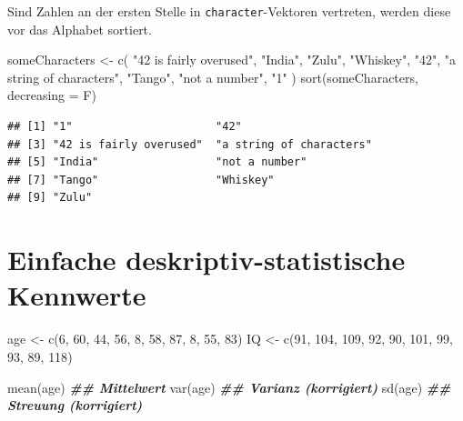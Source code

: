\documentclass[
]{book}
\newenvironment{Shaded}{\begin{snugshade}}{\end{snugshade}}
\newcommand{\AttributeTok}[1]{\textcolor[rgb]{0.77,0.63,0.00}{#1}}
\newcommand{\DecValTok}[1]{\textcolor[rgb]{0.00,0.00,0.81}{#1}}
\newcommand{\DocumentationTok}[1]{\textcolor[rgb]{0.56,0.35,0.01}{\textbf{\textit{#1}}}}
\newcommand{\FunctionTok}[1]{\textcolor[rgb]{0.00,0.00,0.00}{#1}}
\newcommand{\NormalTok}[1]{#1}
\newcommand{\OtherTok}[1]{\textcolor[rgb]{0.56,0.35,0.01}{#1}}
\newcommand{\StringTok}[1]{\textcolor[rgb]{0.31,0.60,0.02}{#1}}
\begin{document}
Sind Zahlen an der ersten Stelle in \texttt{character}-Vektoren vertreten, werden diese vor das Alphabet sortiert.

\begin{Shaded}
\begin{Highlighting}[]
\NormalTok{someCharacters }\OtherTok{\textless{}{-}} \FunctionTok{c}\NormalTok{(}
  \StringTok{"42 is fairly overused"}\NormalTok{,}
  \StringTok{"India"}\NormalTok{,}
  \StringTok{"Zulu"}\NormalTok{,}
  \StringTok{"Whiskey"}\NormalTok{,}
  \StringTok{"42"}\NormalTok{,}
  \StringTok{"a string of characters"}\NormalTok{,}
  \StringTok{"Tango"}\NormalTok{,}
  \StringTok{"not a number"}\NormalTok{,}
  \StringTok{"1"}
\NormalTok{)}
\FunctionTok{sort}\NormalTok{(someCharacters, }\AttributeTok{decreasing =}\NormalTok{ F)}
\end{Highlighting}
\end{Shaded}

\begin{verbatim}
## [1] "1"                      "42"                    
## [3] "42 is fairly overused"  "a string of characters"
## [5] "India"                  "not a number"          
## [7] "Tango"                  "Whiskey"               
## [9] "Zulu"
\end{verbatim}

\hypertarget{einfache-deskriptiv-statistische-kennwerte}{%
\section{Einfache deskriptiv-statistische Kennwerte}\label{einfache-deskriptiv-statistische-kennwerte}}

\begin{Shaded}
\begin{Highlighting}[]
\NormalTok{age }\OtherTok{\textless{}{-}} \FunctionTok{c}\NormalTok{(}\DecValTok{6}\NormalTok{, }\DecValTok{60}\NormalTok{, }\DecValTok{44}\NormalTok{, }\DecValTok{56}\NormalTok{, }\DecValTok{8}\NormalTok{, }\DecValTok{58}\NormalTok{, }\DecValTok{87}\NormalTok{, }\DecValTok{8}\NormalTok{, }\DecValTok{55}\NormalTok{, }\DecValTok{83}\NormalTok{)}
\NormalTok{IQ }\OtherTok{\textless{}{-}} \FunctionTok{c}\NormalTok{(}\DecValTok{91}\NormalTok{, }\DecValTok{104}\NormalTok{, }\DecValTok{109}\NormalTok{, }\DecValTok{92}\NormalTok{, }\DecValTok{90}\NormalTok{, }\DecValTok{101}\NormalTok{, }\DecValTok{99}\NormalTok{, }\DecValTok{93}\NormalTok{, }\DecValTok{89}\NormalTok{, }\DecValTok{118}\NormalTok{)}

\FunctionTok{mean}\NormalTok{(age)  }\DocumentationTok{\#\# Mittelwert}
\FunctionTok{var}\NormalTok{(age)  }\DocumentationTok{\#\# Varianz (korrigiert)}
\FunctionTok{sd}\NormalTok{(age) }\DocumentationTok{\#\# Streuung (korrigiert)}
\end{Highlighting}
\end{Shaded}
\end{document}
